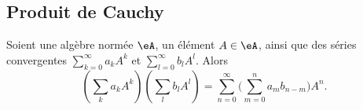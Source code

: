 \subsection{Produit de Cauchy}


\begin{proposition}      \label{PROPooFMEXooCNjdhS}
	Soient une algèbre normée \( \eA\), un élément \( A\in \eA\), ainsi que des séries convergentes \( \sum_{k=0}^{\infty}a_kA^k\) et \( \sum_{l=0}^{\infty}b_lA^l\). Alors
	\begin{equation}
		\left( \sum_ka_kA^k \right)\left( \sum_lb_lA^l \right)=\sum_{n=0}^{\infty}\big( \sum_{m=0}^na_mb_{n-m} \big)A^n.
	\end{equation}
\end{proposition}

